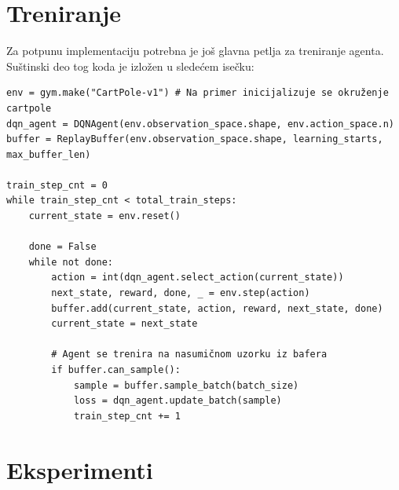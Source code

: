 \documentclass[a4paper,fleqn,12pt]{JMThesis}
\theoremstyle{plain}
\theoremstyle{definition}
\theoremstyle{definition}
\begin{document}
\section{Treniranje}
Za potpunu implementaciju potrebna je još glavna petlja za treniranje agenta. Suštinski deo tog koda je izložen u sledećem isečku:
\begin{verbatim}
env = gym.make("CartPole-v1") # Na primer inicijalizuje se okruženje cartpole
dqn_agent = DQNAgent(env.observation_space.shape, env.action_space.n)
buffer = ReplayBuffer(env.observation_space.shape, learning_starts, max_buffer_len)

train_step_cnt = 0
while train_step_cnt < total_train_steps:
    current_state = env.reset()
    
    done = False
    while not done:
        action = int(dqn_agent.select_action(current_state))
        next_state, reward, done, _ = env.step(action)
        buffer.add(current_state, action, reward, next_state, done)
        current_state = next_state
        
        # Agent se trenira na nasumičnom uzorku iz bafera
        if buffer.can_sample():
            sample = buffer.sample_batch(batch_size)
            loss = dqn_agent.update_batch(sample)
            train_step_cnt += 1
\end{verbatim}
\section{Eksperimenti}
\end{document}
